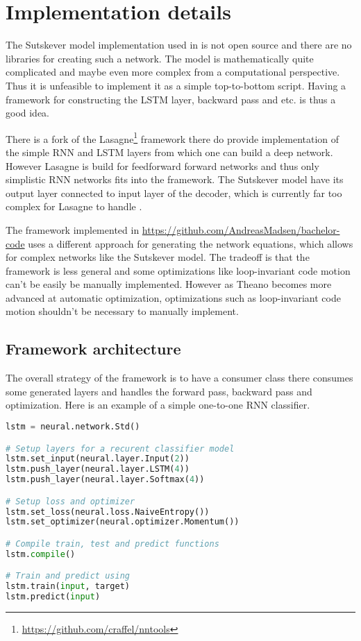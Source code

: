 \chapter{Implementation details}
\label{appendix:implementation}

The Sutskever model implementation used in \cite{sutskever} is not open source and there are no libraries for creating such a network. The model is mathematically quite complicated and maybe even more complex from a computational perspective. Thus it is unfeasible to implement it as a simple top-to-bottom script. Having a framework for constructing the LSTM layer, backward pass and etc. is thus a good idea.

There is a fork of the Lasagne\footnote{\url{https://github.com/craffel/nntools}} framework there do provide implementation of the simple RNN and LSTM layers from which one can build a deep network. However Lasagne is build for feedforward forward networks and thus only simplistic RNN networks fits into the framework. The Sutskever model have its output layer connected to input layer of the decoder, which is currently far too complex for Lasagne to handle \cite{lasagne-issue}.

The framework implemented in \url{https://github.com/AndreasMadsen/bachelor-code} uses a different approach for generating the network equations, which allows for complex networks like the Sutskever model. The tradeoff is that the framework is less general and some optimizations like loop-invariant code motion can't be easily be manually implemented.  However as Theano becomes more advanced at automatic optimization, optimizations such as loop-invariant code motion shouldn't be necessary to manually implement.

\section{Framework architecture}

The overall strategy of the framework is to have a consumer class there consumes some generated layers and handles the forward pass, backward pass and optimization. Here is an example of a simple one-to-one RNN classifier. 

\begin{lstlisting}[language=Python]
lstm = neural.network.Std()

# Setup layers for a recurent classifier model
lstm.set_input(neural.layer.Input(2))
lstm.push_layer(neural.layer.LSTM(4))
lstm.push_layer(neural.layer.Softmax(4))

# Setup loss and optimizer
lstm.set_loss(neural.loss.NaiveEntropy())
lstm.set_optimizer(neural.optimizer.Momentum())

# Compile train, test and predict functions
lstm.compile()

# Train and predict using
lstm.train(input, target)
lstm.predict(input)
\end{lstlisting}

